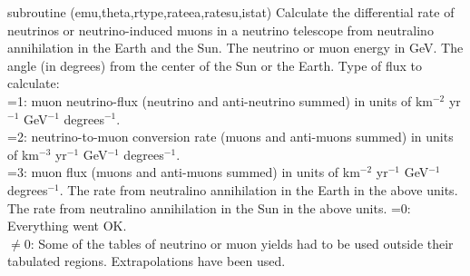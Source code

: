 \begin{sub}{subroutine
(emu,theta,rtype,rateea,ratesu,istat)}
   Calculate the differential 
  rate of neutrinos or neutrino-induced
  muons in a neutrino telescope from neutralino annihilation in the
  Earth and the Sun.
   The neutrino or muon energy in GeV.
   The angle (in degrees) from the center of 
  the Sun or the Earth.
  Type of flux to calculate:\\
  =1: muon neutrino-flux (neutrino and anti-neutrino summed) in units
  of km$^{-2}$ yr$^{-1}$ GeV$^{-1}$ degrees$^{-1}$.\\
  =2: neutrino-to-muon conversion rate (muons and anti-muons summed)
  in units of km$^{-3}$ yr$^{-1}$ GeV$^{-1}$ degrees$^{-1}$.\\
  =3: muon flux (muons and anti-muons summed)
  in units of km$^{-2}$ yr$^{-1}$ GeV$^{-1}$ degrees$^{-1}$.
   The rate from neutralino annihilation in the Earth
  in the above units.
   The rate from neutralino annihilation in the Sun
  in the above units.
   =0: Everything went OK.\\
  $\neq0$: Some of the tables of neutrino or muon yields had to be
  used outside their tabulated regions. Extrapolations have been used.
\end{sub}
